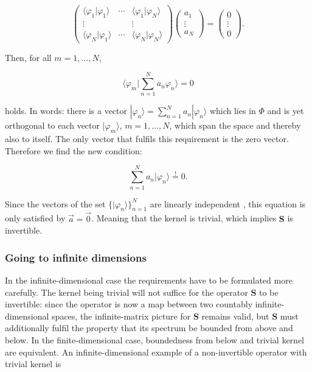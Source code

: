 \begin{equation}
\begin{pmatrix}\langle\varphi_1|\varphi_1\rangle & \cdots & \langle\varphi_1|\varphi_N\rangle\\ \vdots & & \vdots \\ \langle\varphi_N|\varphi_1\rangle & \cdots & \langle\varphi_N|\varphi_N\rangle\end{pmatrix}
\begin{pmatrix}a_1\\\vdots\\a_N\end{pmatrix}
=
\begin{pmatrix}0\\\vdots\\0\end{pmatrix}.
\end{equation}

Then, for all $m=1,\dots,N$,

\begin{equation}
\Big\langle\varphi_m\Big|\sum_{n=1}^N a_n\varphi_n\Big\rangle = 0
\end{equation}

holds. In words: there is a vector $|\varphi_a\rangle=\sum_{n=1}^N a_n|\varphi_n\rangle$
which lies in $\Phi$ and is yet orthogonal to each vector
$|\varphi_m\rangle$, $m=1,\dots,N$, which span the space and thereby also to itself. The only
vector that fulfils this requirement is the zero vector. Therefore we
find the new condition:

\begin{equation}
\sum_{n=1}^N a_n |\varphi_n\rangle \overset{!}{=} 0.
\end{equation}

Since the vectors of the set $\{|\varphi_n\rangle\}_{n=1}^N$ are linearly independent
, this equation is only satisfied by $\vec a=\vec 0$. Meaning
that the kernel is trivial, which implies $\mathbf{S}$ is invertible.

\subsubsection*{Going to infinite dimensions} 
In the infinite-dimensional case the requirements have
to be formulated more carefully. The kernel being trivial will not
suffice for the operator $\mathbf{S}$ to be invertible: since the
operator is now a map between two countably infinite-dimensional
spaces, the infinite-matrix picture for $\mathbf{S}$ remains valid, but
$\mathbf{S}$ must additionally fulfil the property that its spectrum be
bounded from above and below. In the finite-dimensional case,
boundedness from below and trivial kernel are equivalent. An
infinite-dimensional example of a non-invertible operator with trivial
kernel is

